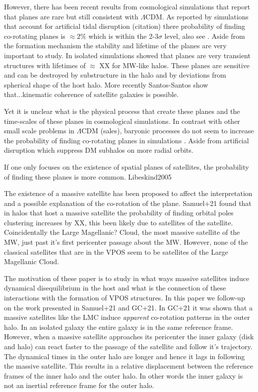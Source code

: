 \documentclass{aastex63}
\begin{document}
However, there has been recent results from cosmological simulations that report that planes are rare but still consistent with $\Lambda$CDM. As reported by \cite{Sawala22, Pham22} simulations that account for artificial tidal disruption (citation) there probability of finding co-rotating planes is $\approx 2\%$ which is within the 2-3$\sigma$ level, also see \cite{Foster22}. 
Aside from the formation mechanism the stability and lifetime of the planes are very important to study. In isolated simulations \cite{Fernando17, Fernando18} showed that planes are very transient structures with lifetimes of $\approx$ XX for MW-like halos. These planes are sensitive and can be destroyed by substructure in the halo and by  deviations from spherical shape of the host halo. More recently Santos-Santos show that...kinematic coherence of satellite galaxies is possible.

Yet it is unclear what is the physical process that create these planes and the time-scales of these planes in cosmological simulations. In contrast with other small scale problems in $\Lambda$CDM (sales), baryonic processes do not seem to increase the probability of finding co-rotating planes in simulations \citep{Ahmed17}. Aside from artificial disruption which suppress DM subhalos on more radial orbits. 

If one only focuses on the existence of spatial planes of satellites, the probability of finding these planes is more common. Libeskind2005



The existence of a massive satellite has been proposed to affect the interpretation and a possible explanation of the co-rotation of the plane. Samuel+21 found that in halos that host a massive satellite the probability of finding orbital poles clustering increases by XX, this been likely due to satellites of the satellite. Coincidentally the Large Magellanic? Cloud, the most massive satellite of the MW, just past it's first pericenter passage about the MW. However, none of the classical satellites that are in the VPOS seem to be satellites of the Large Magellanic Cloud.

The motivation of these paper is to study in what ways massive satellites induce dynamical disequilibrium in the host and what is the connection of these interactions with the formation of VPOS structures. In this paper we follow-up on the work presented in Samuel+21 and GC+21. In GC+21 it was shown that a 
massive satellites like the LMC induce {\textit{apparent}} co-rotation patterns in the outer halo. In an isolated galaxy the entire galaxy is in the same reference frame. However, when a massive satellite approaches its pericenter the inner galaxy (disk and halo) can react faster to the passage of the satellite and follow it's trajectory. The dynamical times in the outer halo are longer and hence it lags in following the massive satellite. This results in a relative displacement between the reference frames of the inner halo and the outer halo. In other words the inner galaxy is not an inertial reference frame for the outer halo. 
\end{document}
